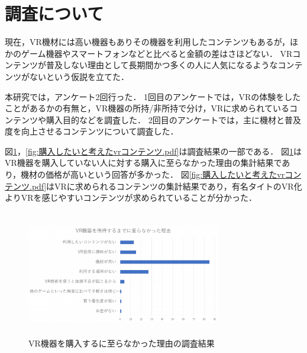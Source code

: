 \documentclass[twocolumn,10pt,a4j]{ltjsarticle}
\begin{document}



\section{調査について}
現在，VR機材には高い機器もありその機器を利用したコンテンツもあるが，ほかのゲーム機器やスマートフォンなどと比べると金額の差はさほどない．
VRコンテンツが普及しない理由として長期間かつ多くの人に人気になるようなコンテンツがないという仮説を立てた．

本研究では，アンケート2回行った．
1回目のアンケートでは，VRの体験をしたことがあるかの有無と，VR機器の所持/非所持で分け，VRに求められているコンテンツや購入目的などを調査した．
2回目のアンケートでは，主に機材と普及度を向上させるコンテンツについて調査した．

図\ref{fig:vr機器を所持するまでに至らなかった理由.pdf}，\ref{fig:購入したいと考えたvrコンテンツ.pdf}は調査結果の一部である．
図\ref{fig:vr機器を所持するまでに至らなかった理由.pdf}はVR機器を購入していない人に対する購入に至らなかった理由の集計結果であり，機材の価格が高いという回答が多かった．
図\ref{fig:購入したいと考えたvrコンテンツ.pdf}はVRに求められるコンテンツの集計結果であり，有名タイトのVR化よりVRを感じやすいコンテンツが求められていることが分かった．

\begin{figure}[h]
\begin{center}
 \includegraphics[clip,width=85mm,height=55mm]{vr機器を所持するまでに至らなかった理由.pdf}
\end{center}
 \caption{VR機器を購入するに至らなかった理由の調査結果}
 \label{fig:vr機器を所持するまでに至らなかった理由.pdf}
\end{figure}
\end{document}
